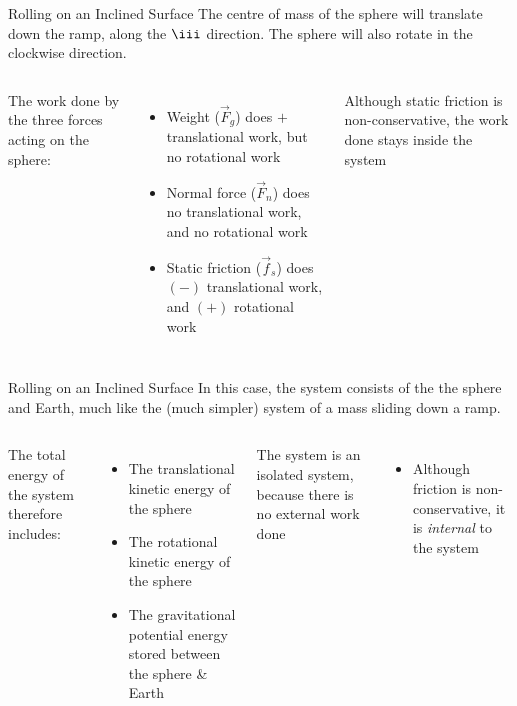 \documentclass[12pt,compress,aspectratio=169]{beamer}
\begin{document}
\begin{frame}{Rolling on an Inclined Surface}
  The centre of mass of the sphere will translate down the ramp, along the
  $\iii$ direction. The sphere will also rotate in the clockwise direction.

  \vspace{.2in}
  \begin{columns}
    

    The work done by the three forces acting on the sphere:
    \begin{itemize}
    \item Weight ($\vec F_g$) does $+$ translational work, but no rotational
      work
    \item Normal force ($\vec F_n$) does no translational work, and no
      rotational work
    \item Static friction ($\vec f_s$) does $(-)$ translational work, and $(+)$
      rotational work
    \end{itemize}
    Although static friction is non-conservative, the work done stays inside
    the system
  \end{columns}    
\end{frame}



\begin{frame}{Rolling on an Inclined Surface}
  In this case, the system consists of the the sphere and Earth, much like the
  (much simpler) system of a mass sliding down a ramp.

  \vspace{.2in}
  \begin{columns}
    

    The total energy of the system therefore includes:
    \begin{itemize}
    \item The translational kinetic energy of the sphere
    \item The rotational kinetic energy of the sphere
    \item The gravitational potential energy stored between the sphere \& Earth
    \end{itemize}
    The system is an isolated system, because there is no external work done
    \begin{itemize}
    \item Although friction is non-conservative, it is \emph{internal} to the
      system
    \end{itemize}
  \end{columns}
\end{frame}
\end{document}
